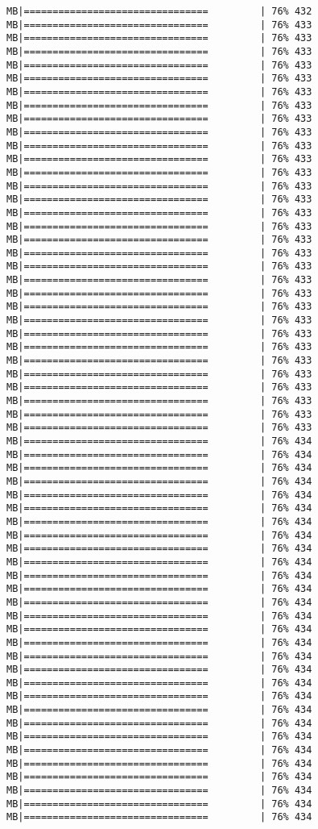 \documentclass[
]{article}
\begin{document}
\begin{verbatim}
MB|================================         | 76% 432 MB|================================         | 76% 433 MB|================================         | 76% 433 MB|================================         | 76% 433 MB|================================         | 76% 433 MB|================================         | 76% 433 MB|================================         | 76% 433 MB|================================         | 76% 433 MB|================================         | 76% 433 MB|================================         | 76% 433 MB|================================         | 76% 433 MB|================================         | 76% 433 MB|================================         | 76% 433 MB|================================         | 76% 433 MB|================================         | 76% 433 MB|================================         | 76% 433 MB|================================         | 76% 433 MB|================================         | 76% 433 MB|================================         | 76% 433 MB|================================         | 76% 433 MB|================================         | 76% 433 MB|================================         | 76% 433 MB|================================         | 76% 433 MB|================================         | 76% 433 MB|================================         | 76% 433 MB|================================         | 76% 433 MB|================================         | 76% 433 MB|================================         | 76% 433 MB|================================         | 76% 433 MB|================================         | 76% 433 MB|================================         | 76% 433 MB|================================         | 76% 433 MB|================================         | 76% 434 MB|================================         | 76% 434 MB|================================         | 76% 434 MB|================================         | 76% 434 MB|================================         | 76% 434 MB|================================         | 76% 434 MB|================================         | 76% 434 MB|================================         | 76% 434 MB|================================         | 76% 434 MB|================================         | 76% 434 MB|================================         | 76% 434 MB|================================         | 76% 434 MB|================================         | 76% 434 MB|================================         | 76% 434 MB|================================         | 76% 434 MB|================================         | 76% 434 MB|================================         | 76% 434 MB|================================         | 76% 434 MB|================================         | 76% 434 MB|================================         | 76% 434 MB|================================         | 76% 434 MB|================================         | 76% 434 MB|================================         | 76% 434 MB|================================         | 76% 434 MB|================================         | 76% 434 MB|================================         | 76% 434 MB|================================         | 76% 434 MB|================================         | 76% 434 MB|================================         | 76% 434 
\end{verbatim}
\end{document}
